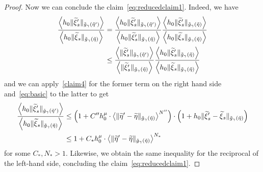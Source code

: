 \documentclass[10pt]{amsart}
\theoremstyle{definition}\newtheorem{defi}[theo]{Definition}\newtheorem{rema}[theo]{Remark}\newtheorem{exam}[theo]{Example}\newtheorem{exem}[theo]{Example}\newtheorem{nota}[theo]{Notation}
\let\oldtilde\tilde
\renewcommand*{\tilde}[1]{\mathchoice{\widetilde{#1}}{\widetilde{#1}}{\oldtilde{#1}}{\oldtilde{#1}}}
\begin{document}
\begin{proof}
Now we can conclude the claim~\eqref{eq:reducedclaim1}. Indeed, we have
\begin{align*}
\frac{\left\langle h_{0}\|\tilde{\xi}'_{s}\|_{\tilde{g}_{\gamma}\left(\tilde{\eta}'\right)}\right\rangle}{\left\langle h_{0}\|\tilde{\xi}_{s}\|_{\tilde{g}_{\gamma}\left(\tilde{\eta}\right)}\right\rangle} & =\frac{\left\langle h_{0}\|\tilde{\xi}'_{s}\|_{\tilde{g}_{\gamma}\left(\tilde{\eta}'\right)}\right\rangle}{\left\langle h_{0}\|\tilde{\xi}'_{s}\|_{\tilde{g}_{\gamma}\left(\tilde{\eta}\right)}\right\rangle}\frac{\left\langle h_{0}\|\tilde{\xi}'_{s}\|_{\tilde{g}_{\gamma}\left(\tilde{\eta}\right)}\right\rangle}{\left\langle h_{0}\|\tilde{\xi}_{s}\|_{\tilde{g}_{\gamma}\left(\tilde{\eta}\right)}\right\rangle}\\
& \le\frac{\left\langle\|\tilde{\xi}'_{s}\|_{\tilde{g}_{\gamma}\left(\tilde{\eta}'\right)}\right\rangle}{\left\langle\|\tilde{\xi}'_{s}\|_{\tilde{g}_{\gamma}\left(\tilde{\eta}\right)}\right\rangle}\frac{\left\langle h_{0}\|\tilde{\xi}'_{s}\|_{\tilde{g}_{\gamma}\left(\tilde{\eta}\right)}\right\rangle}{\left\langle h_{0}\|\tilde{\xi}_{s}\|_{\tilde{g}_{\gamma}\left(\tilde{\eta}\right)}\right\rangle}
\end{align*}
and we can apply~\eqref{claim4} for the former term on the right hand side and~\eqref{eq:basic} to the latter to get
\begin{align*}
\frac{\left\langle h_{0}\|\tilde{\xi}'_{s}\|_{\tilde{g}_{\gamma}\left(\tilde{\eta}'\right)}\right\rangle}{\left\langle h_{0}\|\tilde{\xi}_{s}\|_{\tilde{g}_{\gamma}\left(\tilde{\eta}\right)}\right\rangle} & \le \left(1+C''h_{0}^{\mu}\cdot\left\langle \|\tilde{\eta}'-\tilde{\eta}\|_{\tilde{g}_{\gamma}\left(\tilde{\eta}\right)}\right\rangle ^{N''}\right)\cdot\left(1+h_{0}\|\tilde{\xi}'_{s}-\tilde{\xi}_{s}\|_{\tilde{g}_{\gamma}\left(\tilde{\eta}\right)}\right)\\
& \le1+C_{*}h_{0}^{\mu}\cdot\left\langle \|\tilde{\eta}'-\tilde{\eta}\|_{\tilde{g}_{\gamma}\left(\tilde{\eta}\right)}\right\rangle ^{N_{*}}
\end{align*}
for some $C_{*},N_{*}>1$. Likewise, we obtain the same inequality for the reciprocal of the left-hand side, concluding the claim~\eqref{eq:reducedclaim1}.


\end{proof}
\end{document}

